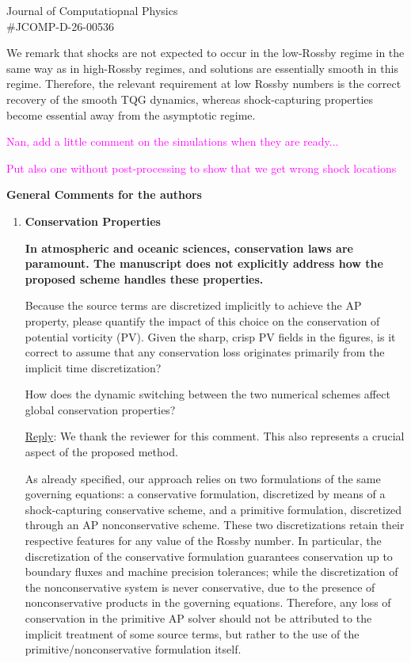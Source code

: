 \documentclass[letter,11pt]{letter}
\begin{document}
\begin{letter}{Journal of Computatiopnal Physics\\\#JCOMP-D-26-00536}
\begin{enumerate}
We remark that shocks are not expected to occur in the low-Rossby regime in the same way as in high-Rossby regimes, and solutions are essentially smooth in this regime. Therefore, the relevant requirement at low Rossby numbers is the correct recovery of the smooth TQG dynamics, whereas shock-capturing properties become essential away from the asymptotic regime.


{\large \textcolor{magenta}{Nan, add a little comment on the simulations when they are ready...}}

{\large \textcolor{magenta}{Put also one without post-processing to show that we get wrong shock locations}}

\end{enumerate}

{\bf General Comments for the authors}
\begin{enumerate}
\item 
{\bf Conservation Properties}\medskip

{\bf In atmospheric and oceanic sciences, conservation laws are paramount. The manuscript does not explicitly address how the proposed scheme handles these properties.

Because the source terms are discretized implicitly to achieve the AP property, please quantify the impact of this choice on the conservation of potential vorticity (PV). Given the sharp, crisp PV fields in the figures, is it correct to assume that any conservation loss originates primarily from the implicit time discretization?

How does the dynamic switching between the two numerical schemes affect global conservation properties?}

\medskip
{\sc\underline{Reply}}: We thank the reviewer for this comment. 
%
This also represents a crucial aspect of the proposed method.

As already specified, our approach relies on two formulations of the same governing equations: a conservative formulation, discretized by means of a shock-capturing conservative scheme, and a primitive formulation, discretized through an AP nonconservative scheme. These two discretizations retain their respective features for any value of the Rossby number. In particular, the discretization of the conservative formulation guarantees conservation up to boundary fluxes and machine precision tolerances; 
while the discretization of the nonconservative system is never conservative, due to the presence of nonconservative products in the governing equations. Therefore, any loss of conservation in the primitive AP solver should not be attributed to the implicit treatment of some source terms, but rather to the use of the primitive/nonconservative formulation itself.


\end{enumerate}
\end{letter}
\end{document}
